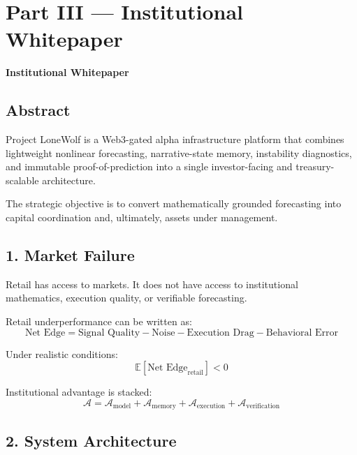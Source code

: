 \documentclass[11pt]{article}
\begin{document}
\newpage

\section*{Part III --- Institutional Whitepaper}

\begin{center}
{\LARGE\bfseries Institutional Whitepaper}
\end{center}

\subsection*{Abstract}

Project LoneWolf is a Web3-gated alpha infrastructure platform that combines lightweight nonlinear forecasting, narrative-state memory, instability diagnostics, and immutable proof-of-prediction into a single investor-facing and treasury-scalable architecture.

The strategic objective is to convert mathematically grounded forecasting into capital coordination and, ultimately, assets under management.

\subsection*{1. Market Failure}

\begin{thesisbox}
Retail has access to markets. It does not have access to institutional mathematics, execution quality, or verifiable forecasting.
\end{thesisbox}

Retail underperformance can be written as:
\[
\text{Net Edge} = \text{Signal Quality} - \text{Noise} - \text{Execution Drag} - \text{Behavioral Error}
\]

Under realistic conditions:
\[
\mathbb{E}[\text{Net Edge}_{\text{retail}}] < 0
\]

Institutional advantage is stacked:
\[
\mathcal{A} =
\mathcal{A}_{\text{model}} +
\mathcal{A}_{\text{memory}} +
\mathcal{A}_{\text{execution}} +
\mathcal{A}_{\text{verification}}
\]

\subsection*{2. System Architecture}
\end{document}
